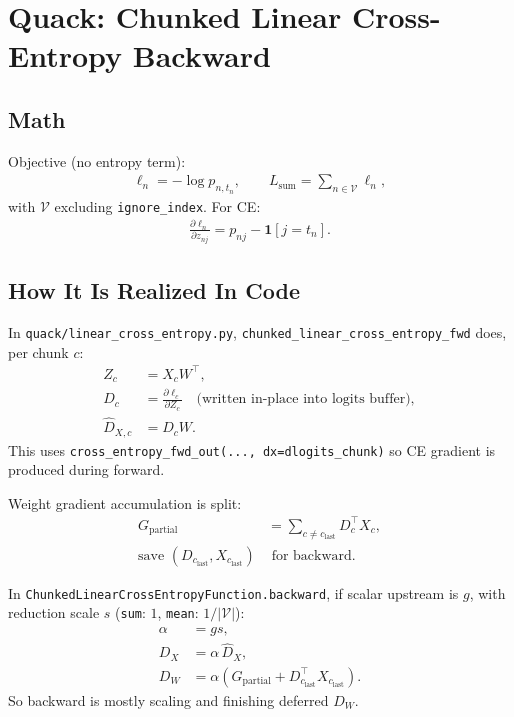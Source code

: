 \documentclass[11pt]{article}
\begin{document}
\section{Quack: Chunked Linear Cross-Entropy Backward}
\subsection{Math}
Objective (no entropy term):
\begin{align}
\ell_n = -\log p_{n,t_n}, \qquad
L_{\mathrm{sum}} = \sum_{n\in\mathcal{V}} \ell_n,
\end{align}
with $\mathcal{V}$ excluding \texttt{ignore\_index}.
For CE:
\begin{align}
\frac{\partial \ell_n}{\partial z_{nj}} = p_{nj} - \mathbf{1}[j=t_n].
\end{align}

\subsection{How It Is Realized In Code}
In \texttt{quack/linear\_cross\_entropy.py},
\texttt{chunked\_linear\_cross\_entropy\_fwd} does, per chunk $c$:
\begin{align}
Z_c &= X_c W^\top, \\
D_c &= \frac{\partial \ell_c}{\partial Z_c}
\quad\text{(written in-place into logits buffer)}, \\
\widehat D_{X,c} &= D_c W.
\end{align}
This uses \texttt{cross\_entropy\_fwd\_out(..., dx=dlogits\_chunk)} so CE
gradient is produced during forward.

Weight gradient accumulation is split:
\begin{align}
G_{\mathrm{partial}} &= \sum_{c\neq c_{\mathrm{last}}} D_c^\top X_c, \\
\text{save }(D_{c_{\mathrm{last}}}, X_{c_{\mathrm{last}}})&\text{ for backward}.
\end{align}

In \texttt{ChunkedLinearCrossEntropyFunction.backward}, if scalar upstream is
$g$, with reduction scale $s$ (\texttt{sum}: $1$, \texttt{mean}: $1/|\mathcal{V}|$):
\begin{align}
\alpha &= gs, \\
D_X &= \alpha\,\widehat D_X, \\
D_W &= \alpha\left(G_{\mathrm{partial}} + D_{c_{\mathrm{last}}}^\top X_{c_{\mathrm{last}}}\right).
\end{align}
So backward is mostly scaling and finishing deferred $D_W$.
\end{document}
